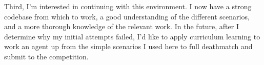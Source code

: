 \documentclass[letterpaper]{article}
\begin{document}
	Third, I'm interested in continuing with this environment. I now have a strong codebase from which to work, a good understanding of the different scenarios, and a more thorough knowledge of the relevant work. In the future, after I determine why my initial attempts failed, I'd like to apply curriculum learning to work an agent up from the simple scenarios I used here to full deathmatch and submit to the competition. 
	
	
	
	
	
	
\end{document}
